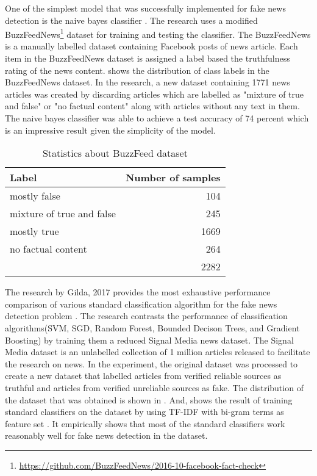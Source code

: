 One of the simplest model that was successfully implemented for fake news detection is the naive bayes classifier \cite{granik2017fake}. The research uses a modified BuzzFeedNews\footnote{\url{https://github.com/BuzzFeedNews/2016-10-facebook-fact-check}} dataset for training and testing the classifier. The BuzzFeedNews is a manually labelled dataset containing Facebook posts of news article. Each item in the BuzzFeedNews dataset is assigned a label based the truthfulness rating of the news content.  shows the distribution of class labels in the BuzzFeedNews dataset. In the research, a new dataset containing 1771 news articles was created by discarding articles which are labelled as "mixture of true and false" or "no factual content" along with articles without any text in them. The naive bayes classifier was able to achieve a test accuracy of 74 percent which is an impressive result given the simplicity of the model.

\begin{table}[h]
\begin{center}
\caption{Statistics about BuzzFeed dataset}
\label{tbl:buzzfeed_dataset}
\begin{tabular}{lr}
\toprule 
Label&Number of samples \\
\midrule 
mostly false&104 \\
mixture of true and false&245 \\
mostly true&1669 \\
no factual content&264 \\
\midrule
&2282 \\
\bottomrule
\end{tabular}
\end{center}
\end{table}

The research by Gilda, 2017 provides the most exhaustive performance comparison of various standard classification algorithm for the fake news detection problem \cite{gilda2017evaluating}. The research contrasts the performance of classification algorithms(SVM, SGD, Random Forest, Bounded Decison Trees, and Gradient Boosting) by training them a reduced Signal Media news dataset\cite{corney2016million}. The Signal Media dataset is an unlabelled collection of 1 million articles released to facilitate the research on news. In the experiment, the original dataset was processed to create a new dataset that labelled articles from verified reliable sources as truthful and articles from verified unreliable sources as fake. The distribution of the dataset that was obtained is shown in . And,  shows the result of training standard classifiers on the dataset by using TF-IDF with bi-gram terms as feature set \cite{gilda2017evaluating}. It empirically shows that most of the standard classifiers work reasonably well for fake news detection in the dataset. 

